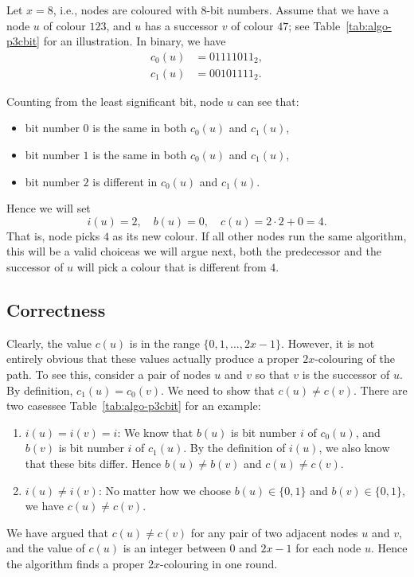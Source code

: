 Let $x = 8$, i.e., nodes are coloured with $8$-bit numbers. Assume that we have a node $u$ of colour $123$, and $u$ has a successor $v$ of colour $47$; see Table~\ref{tab:algo-p3cbit} for an illustration. In binary, we have
\begin{align*}
    c_0(u) &= 01111011_2, \\
    c_1(u) &= 00101111_2.
\end{align*}
\begin{samepage}
Counting from the least significant bit, node $u$ can see that:
\begin{itemize}[noitemsep]
    \item bit number $0$ is the same in both $c_0(u)$ and $c_1(u)$,
    \item bit number $1$ is the same in both $c_0(u)$ and $c_1(u)$,
    \item bit number $2$ is different in $c_0(u)$ and $c_1(u)$.
\end{itemize}
\end{samepage}
Hence we will set
\[
    i(u) = 2, \quad
    b(u) = 0, \quad
    c(u) = 2\cdot2 + 0 = 4.
\]
That is, node picks $4$ as its new colour. If all other nodes run the same algorithm, this will be a valid choice\mydash as we will argue next, both the predecessor and the successor of $u$ will pick a colour that is different from $4$.


\subsection{Correctness}

Clearly, the value $c(u)$ is in the range $\{0,1,\dotsc,2x-1\}$. However, it is not entirely obvious that these values actually produce a proper $2x$-colouring of the path. To see this, consider a pair of nodes $u$ and $v$ so that $v$ is the successor of $u$. By definition, $c_1(u) = c_0(v)$. We need to show that $c(u) \ne c(v)$. There are two cases\mydash see Table~\ref{tab:algo-p3cbit} for an example:
\begin{enumerate}
    \item $i(u) = i(v) = i$: We know that $b(u)$ is bit number $i$ of $c_0(u)$, and $b(v)$ is bit number $i$ of $c_1(u)$. By the definition of $i(u)$, we also know that these bits differ. Hence $b(u) \ne b(v)$ and $c(u) \ne c(v)$.
    \item $i(u) \ne i(v)$: No matter how we choose $b(u) \in \{0,1\}$ and $b(v) \in \{0,1\}$, we have $c(u) \ne c(v)$.
\end{enumerate}
We have argued that $c(u) \ne c(v)$ for any pair of two adjacent nodes $u$ and $v$, and the value of $c(u)$ is an integer between $0$ and $2x-1$ for each node $u$. Hence the algorithm finds a proper $2x$-colouring in one round.


